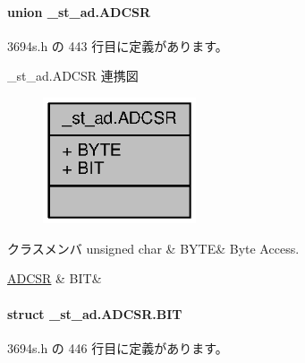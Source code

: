 \paragraph{union \+\_\+st\+\_\+ad.\+A\+D\+C\+S\+R}


 3694s.\+h の 443 行目に定義があります。



\+\_\+st\+\_\+ad.\+A\+D\+C\+S\+R 連携図
\nopagebreak
\begin{figure}[H]
\begin{center}
\leavevmode
\includegraphics[width=128pt]{d2/d00/union__st__ad_8ADCSR__coll__graph}
\end{center}
\end{figure}
\begin{DoxyFields}{クラスメンバ}
unsigned char\label{3694s_8h_ae409eb2ba6eb6801f52763ae370c350e}
&
B\+Y\+T\+E&
Byte Access. \\
\hline

\hyperlink{3694s_8h_d4/dc9/struct__st__ad_8ADCSR_8BIT}{A\+D\+C\+S\+R}\label{3694s_8h_adb957fdc8000e1eef04a243f5199aa52}
&
B\+I\+T&
\\
\hline

\end{DoxyFields}
\label{struct__st__ad_8ADCSR_8BIT}
\paragraph{struct \+\_\+st\+\_\+ad.\+A\+D\+C\+S\+R.\+B\+I\+T}


 3694s.\+h の 446 行目に定義があります。



